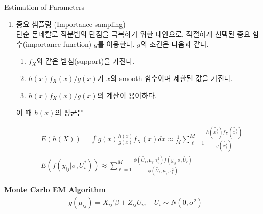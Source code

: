 \documentclass[9pt, xelatex]{beamer}
\begin{document}
{\begin{frame}[allowframebreaks]{Estimation of Parameters}
\begin{enumerate}
		표본에 의해 발생되는 분산의 증가를 가져오는 단점을 가지게 된다. \\
		\vspace{1mm}
		또한 $f_X$로부터 직접적으로 표본을 추출하는 것이 불가능한 경우 적용불가능하다. 
		
		\framebreak
		
		\item 중요 샘플링 (Importance sampling) \\
		\vspace{2mm}
		단순 몬테칼로 적분법의 단점을 극복하기 위한 대안으로, 적절하게 선택된 중요 함수(importance function) $g$를 이용한다. $g$의 조건은 다음과 같다. \\
		\vspace{1mm}
		\begin{enumerate}
			\item $f_X$와 같은 받침(support)을 가진다. 
			\item $h(x)f_X(x)/g(x)$가 $x$의 smooth 함수이며 제한된 값을 가진다.
			\item $h(x)f_X(x)/g(x)$의 계산이 용이하다. 
		\end{enumerate}
		\vspace{1mm}
		이 때 $h(x)$의 평균은 
		
		\begin{align*}
			& E(h(X)) = \int g(x) \frac{h(x)}{g(x)}f_X(x) dx  \approx \frac{1}{M}\sum_{\ell=1}^{M} \frac{h(\tilde{x_\ell^*})f_X(\tilde{x_{\ell}^*})}{g(\tilde{x_{\ell}^*})} \\
			& E(f(y_{ij}\vert \sigma, U_i^*)) \approx \sum_{\ell=1}^M 
				\frac{\phi(\tilde{U_{\ell}};\mu_i, \tau_i^2)f(y_{ij}\vert \sigma, \tilde{U_\ell})}{\phi(\tilde{U_{\ell}};\mu_i, \tau_i^2)}
		\end{align*}
	\end{enumerate}
	
	\framebreak
		
		\textbf{Monte Carlo EM Algorithm}
		\vspace{2mm}
		\begin{align*}
			& g(\mu_{ij}) = X_{ij}'\beta + Z_{ij}U_i, \quad U_i \sim N(0,\sigma^2)
		\end{align*}
	
		\vspace{4mm} 


\end{frame}}
\end{document}
